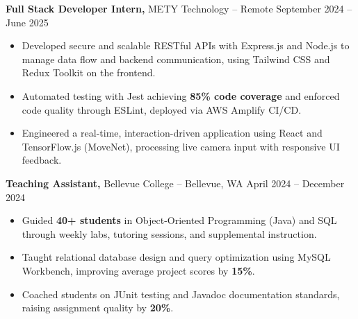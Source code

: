 \documentclass[11pt]{article}       %
\begin{document}
\textbf{Full Stack Developer Intern,} {METY Technology} -- Remote \hfill September 2024 -- June 2025 \\
\vspace{-9pt}
\begin{itemize}
  \item Developed secure and scalable RESTful APIs with Express.js and Node.js to manage data flow and backend communication, using Tailwind CSS and Redux Toolkit on the frontend.
  \item Automated testing with Jest achieving \textbf{85\% code coverage} and enforced code quality through ESLint, deployed via AWS Amplify CI/CD.
  \item Engineered a real-time, interaction-driven application using React and TensorFlow.js (MoveNet), processing live camera input with responsive UI feedback.
\end{itemize}

\textbf{Teaching Assistant,} {Bellevue College} -- Bellevue, WA \hfill April 2024 -- December 2024 \\
\vspace{-9pt}
\begin{itemize}
  \item Guided \textbf{40+ students} in Object-Oriented Programming (Java) and SQL through weekly labs, tutoring sessions, and supplemental instruction.
  \item Taught relational database design and query optimization using MySQL Workbench, improving average project scores by \textbf{15\%}.
  \item Coached students on JUnit testing and Javadoc documentation standards, raising assignment quality by \textbf{20\%}.
\end{itemize}

\end{document}
